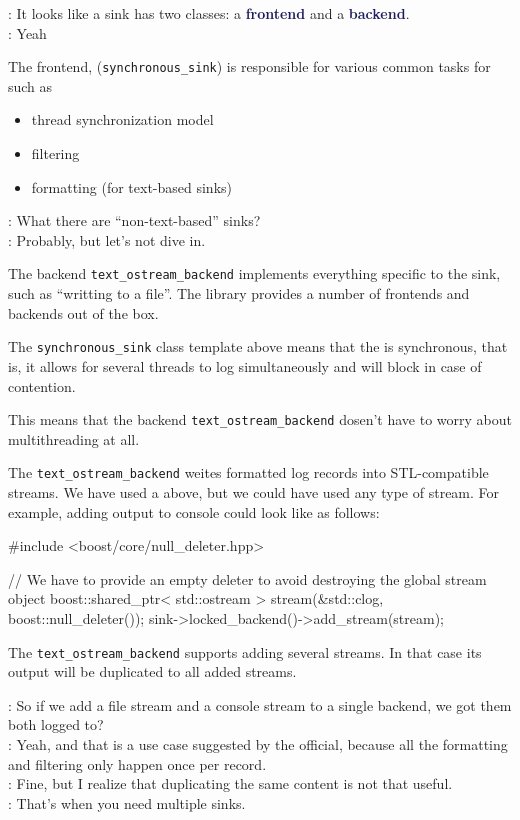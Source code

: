\documentclass[dvipsnames]{article}
\newcommand{\mycola}{MidnightBlue}
\newcommand{\Cola}[1]{\textcolor{\mycola}{\textbf{#1}}}
\let\emph\relax %
\let\emph\relax %
\begin{document}
\begin{tcolorbox}
   : It looks like a sink has two classes: a \Cola{frontend} and a \Cola{ backend}.\\
   : Yeah
\end{tcolorbox}
The frontend, (\texttt{synchronous\_sink}) is responsible for various common tasks for \emph{all sinks} such as
\begin{itemize}
\item thread synchronization model
\item filtering               %
\item formatting (for text-based sinks)
\end{itemize}
\begin{tcolorbox}
   : What there are ``non-text-based'' sinks?\\
   : Probably, but let's not dive in.
\end{tcolorbox}

The backend \verb|text_ostream_backend| implements everything specific to the
sink, such as ``writting to a file''. The library provides a number of
frontends and backends out of the box.

The \verb|synchronous_sink| class template above means that the \emph{sink} is
synchronous, that is, it allows for several threads to log simultaneously and
will block in case of contention.

This means that the backend \verb|text_ostream_backend| dosen't have to worry
about multithreading at all.

The \verb|text_ostream_backend| weites formatted log records into
STL-compatible streams. We have used a \emph{file stream} above, but we could
have used any type of stream. For example, adding output to console could look
like as follows:

\begin{simplec}
  #include <boost/core/null_deleter.hpp>

  // We have to provide an empty deleter to avoid destroying the global stream object
  boost::shared_ptr< std::ostream > stream(&std::clog, boost::null_deleter());
  sink->locked_backend()->add_stream(stream);
\end{simplec}

The \verb|text_ostream_backend| supports adding several streams. In that case
its output will be duplicated to all added streams.

\begin{tcolorbox}
   : So if we add a file stream and a console stream to a single
  backend, we got them both logged to?\\
   : Yeah, and that is a use case suggested by the official,
  because all the formatting and filtering only happen once per record.\\

   : Fine, but I realize that duplicating the same content is not
  that useful.\\
   : That's when you need multiple sinks.
\end{tcolorbox}
\end{document}
